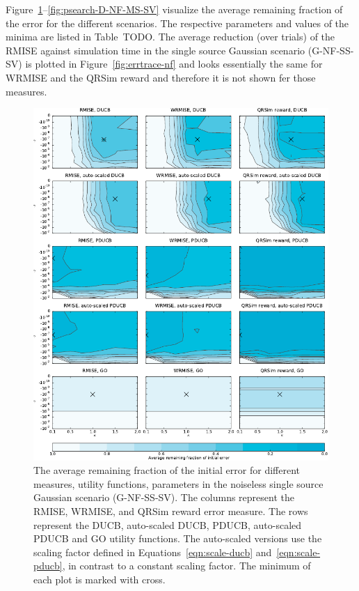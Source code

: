 Figure~\ref{fig:psearch-G-NF-SS-SV}--\ref{fig:psearch-D-NF-MS-SV} visualize the 
average remaining fraction of the error for the different scenarios.  The 
respective parameters and values of the minima are listed in Table~TODO\@.  The 
average reduction (over trials) of the RMISE against simulation time in the 
single source Gaussian scenario (G-NF-SS-SV) is plotted in 
Figure~\ref{fig:errtrace-nf} and looks essentially the same for WRMISE and the 
QRSim reward and therefore it is not shown fer those measures.

\begin{figure}
    \centering
    \includegraphics{plots/psearch-G-NF-SS-SV}
    \caption[Remaining fraction of the initial error (G-NF-SS-SV)]{The average 
        remaining fraction of the initial error for different measures, utility 
        functions, parameters in the noiseless single source Gaussian scenario 
        (G-NF-SS-SV).  The columns represent the RMISE, WRMISE, and QRSim reward 
        error measure.  The rows represent the DUCB, auto-scaled DUCB, PDUCB, 
        auto-scaled PDUCB and GO utility functions. The auto-scaled versions use 
        the scaling factor defined in Equations~\ref{eqn:scale-ducb} 
        and~\ref{eqn:scale-pducb}, in contrast to a constant scaling factor. The 
        minimum of each plot is marked with 
        cross.}\label{fig:psearch-G-NF-SS-SV}
\end{figure}
